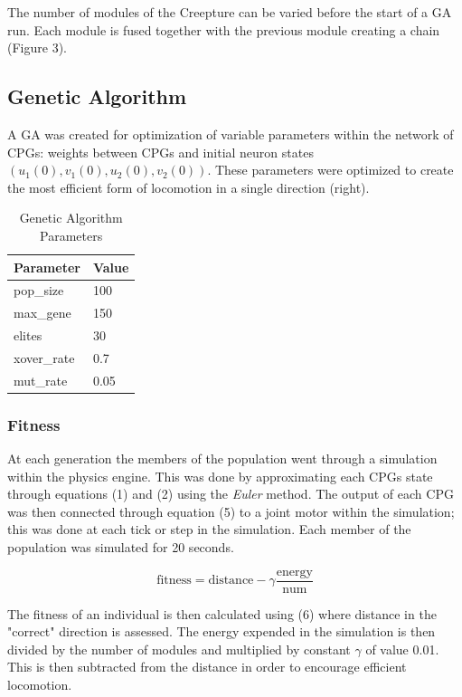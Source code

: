 \documentclass{acm_proc_article-sp}
\begin{document}
The number of modules of the Creepture can be varied before the start of
a GA run. Each module is fused together with the previous module
creating a chain (Figure 3).

\subsection{Genetic Algorithm}\label{genetic-algorithm}

A GA was created for optimization of variable parameters within the
network of CPGs: weights between CPGs and initial neuron states
$(u_1(0), v_1(0), u_2(0), v_2(0))$. These parameters were optimized to
create the most efficient form of locomotion in a single direction
(right).

\begin{table}
\centering
\caption{Genetic Algorithm Parameters}
\begin{tabular}{|l|l|} \hline
Parameter & Value\\ \hline
pop\_size & 100\\ \hline
max\_gene & 150\\ \hline
elites & 30\\ \hline
xover\_rate & 0.7\\ \hline
mut\_rate & 0.05\\ \hline
\end{tabular}
\end{table}

\subsubsection{Fitness}

At each generation the members of the population went through a
simulation within the physics engine. This was done by approximating
each CPGs state through equations (1) and (2) using the \emph{Euler}
method. The output of each CPG was then connected through equation (5)
to a joint motor within the simulation; this was done at each tick or step in the
simulation. Each member of the population was simulated for 20 seconds.

\begin{equation}
    \text{fitness} = \text{distance} - \gamma \frac{\text{energy}}{\text{num}}
\end{equation}

The fitness of an individual is then calculated using (6) where distance in the "correct" direction is assessed.
The energy expended in the simulation is then divided by the number of modules and
multiplied by constant $\gamma$ of value 0.01. This is then subtracted from
the distance in order to encourage efficient locomotion.
\end{document}
